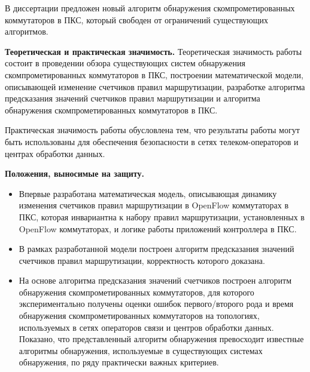 \documentclass[14pt,autoref,href]{disser}
\theoremstyle{definition}
\begin{document}
В диссертации предложен новый алгоритм обнаружения скомпрометированных коммутаторов в ПКС, который свободен от ограничений существующих алгоритмов.

\textbf{Теоретическая и практическая значимость.} Теоретическая значимость работы состоит в проведении обзора существующих систем обнаружения скомпрометированных коммутаторов в ПКС, построении математической модели, описывающей изменение счетчиков правил маршрутизации, разработке алгоритма предсказания значений счетчиков правил маршрутизации и алгоритма обнаружения скомпрометированных коммутаторов в ПКС.

Практическая значимость работы обусловлена тем, что результаты работы могут быть использованы для обеспечения безопасности в сетях телеком-операторов и центрах обработки данных.

\textbf{Положения, выносимые на защиту.}
\begin{itemize}
\item Впервые разработана математическая модель, описывающая динамику изменения счетчиков правил маршрутизации в OpenFlow коммутаторах в ПКС, которая инвариантна к набору правил маршрутизации, установленных в OpenFlow коммутаторах, и логике работы приложений контроллера в ПКС.
\item В рамках разработанной модели построен алгоритм предсказания значений счетчиков правил маршрутизации, корректность которого доказана.
\item На основе алгоритма предсказания значений счетчиков построен алгоритм обнаружения скомпрометированных коммутаторов, для которого экспериментально получены оценки ошибок первого/второго рода и время обнаружения скомпрометированных коммутаторов на топологиях, используемых в сетях операторов связи и центров обработки данных.
Показано, что представленный алгоритм обнаружения превосходит известные алгоритмы обнаружения, используемые в существующих системах обнаружения, по ряду практически важных критериев.
\end{itemize}
\end{document}
